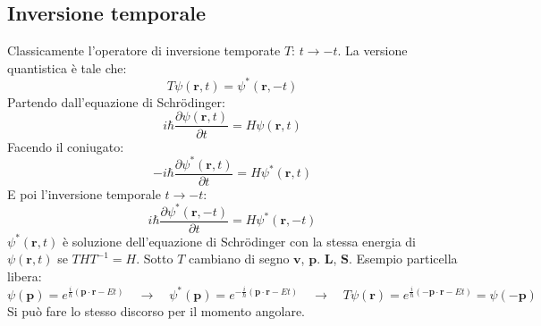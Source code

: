 \subsection{Inversione temporale}
Classicamente l'operatore di inversione temporate $T$: $t\to-t$. La versione quantistica è tale che:
\begin{equation*}
    T\psi(\mathbf{r},t)=\psi^*(\mathbf{r},-t)
\end{equation*}
Partendo dall'equazione di Schr\"odinger:
\begin{equation*}
    i\hbar\frac{\partial\psi(\mathbf{r},t)}{\partial t}=H\psi(\mathbf{r},t)
\end{equation*}
Facendo il coniugato:
\begin{equation*}
    -i\hbar\frac{\partial\psi^*(\mathbf{r},t)}{\partial t}=H\psi^*(\mathbf{r},t)
\end{equation*}
E poi l'inversione temporale $t\to-t$:
\begin{equation*}
    i\hbar\frac{\partial\psi^*(\mathbf{r},-t)}{\partial t}=H\psi^*(\mathbf{r},-t)
\end{equation*}
$\psi^*(\mathbf{r},t)$ è soluzione dell'equazione di Schr\"odinger con la stessa energia di $\psi(\mathbf{r},t)$ se $THT^{-1}=H$. Sotto $T$ cambiano di segno $\mathbf{v}$, $\mathbf{p}$. $\mathbf{L}$, $\mathbf{S}$. Esempio particella libera:
\begin{equation*}
    \psi(\mathbf{p})=e^{\frac{i}{\hbar}(\mathbf{p}\cdot\mathbf{r}-Et)} \quad \to \quad \psi^*(\mathbf{p})=e^{-\frac{i}{\hbar}(\mathbf{p}\cdot\mathbf{r}-Et)} \quad \to \quad T\psi(\mathbf{r})=e^{\frac{i}{\hbar}(-\mathbf{p}\cdot\mathbf{r}-Et)}=\psi(-\mathbf{p})
\end{equation*}
Si può fare lo stesso discorso per il momento angolare.
